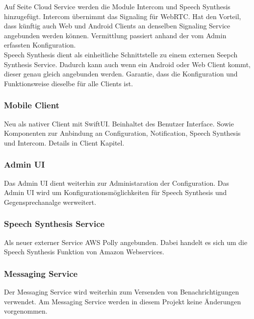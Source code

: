 Auf Seite Cloud Service werden die Module Intercom und Speech Synthesis hinzugefügt.
Intercom übernimmt das Signaling für WebRTC.
Hat den Vorteil, dass künftig auch Web und Android Clients an denselben Signaling Service angebunden werden können.
Vermittlung passiert anhand der vom Admin erfassten Konfiguration. \\

Speech Synthesis dient als einheitliche Schnittstelle zu einem externen Seepch Synthesis Service.
Dadurch kann auch wenn ein Android oder Web Client kommt, dieser genau gleich angebunden werden.
Garantie, dass die Konfiguration und Funktionsweise dieselbe für alle Clients ist. \\

\subsubsection*{Mobile Client}

Neu als nativer Client mit SwiftUI.
Beinhaltet des Benutzer Interface.
Sowie Komponenten zur Anbindung an Configuration, Notification, Speech Synthesis und Intercom.
Details in Client Kapitel. \\

\subsubsection*{Admin UI}
Das Admin UI dient weiterhin zur Administaration der Configuration.
Das Admin UI wird um Konfigurationsmöglichkeiten für Speech Synthesis und Gegensprechanalge werweitert. \\


\subsubsection*{Speech Synthesis Service}
Als neuer externer Service AWS Polly angebunden.
Dabei handelt es sich um die Speech Synthesis Funktion von Amazon Webservices. \\


\subsubsection*{Messaging Service}
Der Messaging Service wird weiterhin zum Versenden von Benachrichtigungen verwendet.
Am Messaging Service werden in diesem Projekt keine Änderungen vorgenommen. \\

\clearpage


